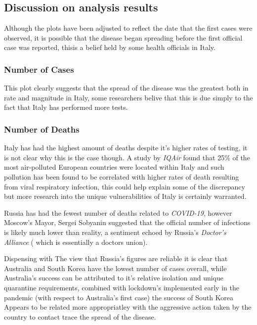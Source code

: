 \documentclass[11pt]{article}
\begin{document}
\subsection{Discussion on analysis results}
\label{sec:orga92e6bb}
Although the plots have been adjusted to reflect the date that the first cases were observed, it is possible that the disease began spreading before the first official case was reported, thisis a belief held by some health officials in Italy.\cite{godin2020}

\subsubsection{Number of Cases}
\label{sec:org0fc6d12}
This plot clearly suggests that the spread of the disease was the greatest both in rate and magnitude in Italy, some researchers belive that this is due simply to the fact that Italy has performed more tests. \cite{godin2020}
\subsubsection{Number of Deaths}
\label{sec:org313e755}
Italy has had the highest amount of deaths despite it's higher rates of testing,
it is not clear why this is the case though. A study by \emph{IQAir} found that 25\% of the
most air-polluted European countries were located within Italy \cite{iqair2019}
and such pollution has been found to be correlated with higher rates of death
resulting from viral respiratory infection,
\cite{ciencewicki2007,croft2019,zhang2019} this could help explain some of the discrepancy but more research into the unique vulnerabilities of Italy is certainly warranted.

Russia has had the fewest number of deaths related to \emph{COVID-19}, however Moscow's Mayor, Sergei Sobyanin suggested that the official number of infections is likely much lower than reality, a sentiment echoed by Russia's \emph{Doctor's Alliance} ( which is essentially a doctors union). \cite{dole2020}

Dispensing with The view that Russia's figures are reliable it is clear that
Australia and South Korea have the lowest number of cases overall, while
Australia's success can be attributed to it's relative isolation and unique
quarantine requirements,
\cite{departmentofagrigulturewaterandtheenvironmentaustralia2019} combined with
lockdown's implemented early in the pandemic (with respect to Australia's first
case) \cite{willis2020} the success of South Korea Appears to be related more
appropriatley with the aggressive action taken by the country to contact trace the spread of the disease. \cite{thompson2020}
\end{document}
